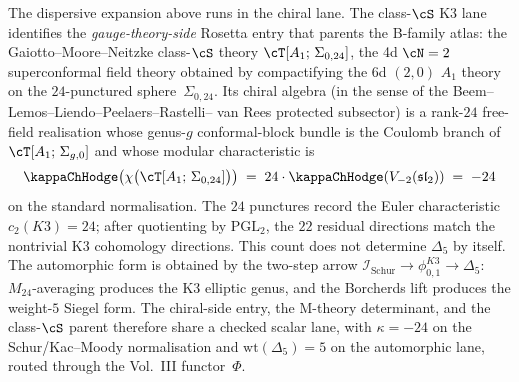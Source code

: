 \begin{remark}[class-$\cS$ $A_1$ on $\Sigma_{0,24}$ as the 4d $\cN=2$ parent]
\label{rem:rosetta-classS-sigma-0-24}
%
%
%
The dispersive expansion above runs in the chiral lane. The class-$\cS$
K3 lane
identifies the \emph{gauge-theory-side} Rosetta entry that parents
the B-family atlas: the Gaiotto--Moore--Neitzke class-$\cS$ theory
$\cT[A_1;\,\Sigma_{0,24}]$, the 4d $\cN=2$ superconformal field
theory obtained by compactifying the 6d $(2,0)$ $A_1$ theory on the
$24$-punctured sphere~$\Sigma_{0,24}$. Its chiral algebra
\textup{(}in the sense of the Beem--Lemos--Liendo--Peelaers--Rastelli--
van Rees protected subsector\textup{)} is a rank-$24$ free-field
realisation whose genus-$g$ conformal-block bundle is the Coulomb
branch of $\cT[A_1;\,\Sigma_{g,0}]$ and whose modular characteristic is
\[
\kappaChHodge\bigl(\chi\bigl(\cT[A_1;\,\Sigma_{0,24}]\bigr)\bigr)
\;=\;
24 \cdot \kappaChHodge(V_{-2}(\mathfrak{sl}_2))
\;=\;
-24
\]
on the standard normalisation. The $24$ punctures record the Euler
characteristic $c_2(K3)=24$; after quotienting by $\mathrm{PGL}_2$,
the $22$ residual directions match the nontrivial K3 cohomology
directions. This count does not determine $\Delta_5$ by itself. The
automorphic form is obtained by the two-step arrow
$\mathcal I_{\mathrm{Schur}}\to\phi_{0,1}^{K3}\to\Delta_5$:
$M_{24}$-averaging produces the K3 elliptic genus, and the
Borcherds lift produces the weight-$5$ Siegel form. The chiral-side
entry, the M-theory determinant, and the class-$\cS$ parent therefore
share a checked scalar lane, with $\kappa=-24$ on the Schur/Kac--Moody
normalisation and $\mathrm{wt}(\Delta_5)=5$ on the automorphic lane,
routed through the Vol.~III functor~$\Phi$.
\end{remark}

